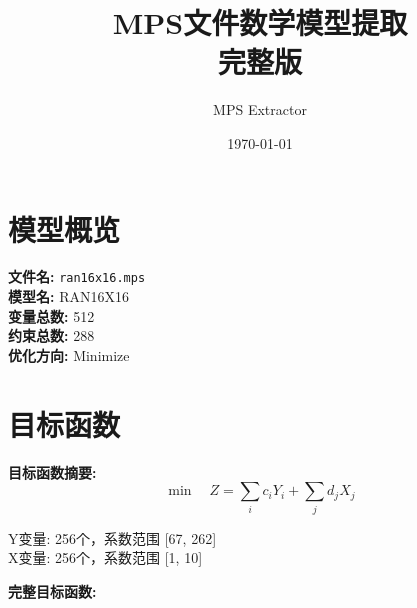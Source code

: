 \documentclass[a4paper,10pt]{article}
\title{MPS文件数学模型提取\\{\large 完整版}}
\author{MPS Extractor}
\date{\today}
\begin{document}
\maketitle
\tableofcontents
\newpage

\section{模型概览}

\textbf{文件名:} \texttt{ran16x16.mps} \\
\textbf{模型名:} RAN16X16 \\
\textbf{变量总数:} 512 \\
\textbf{约束总数:} 288 \\
\textbf{优化方向:} Minimize \\

\section{目标函数}

\textbf{目标函数摘要:}
\begin{equation}
\min \quad Z = \sum_{i} c_i Y_i + \sum_{j} d_j X_j
\end{equation}

Y变量: 256个，系数范围 [67, 262] \\
X变量: 256个，系数范围 [1, 10]

\textbf{完整目标函数:}
\end{document}
